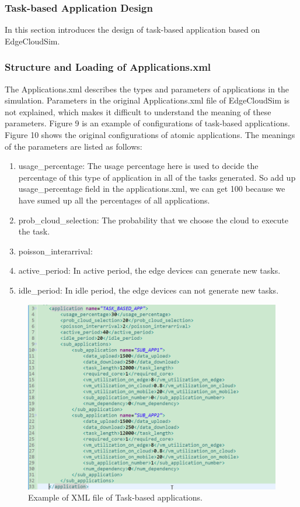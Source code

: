 \subsubsection{Task-based Application Design}
In this section introduces the design of task-based application based on EdgeCloudSim.

\subsubsection{Structure and Loading of Applications.xml}
The Applications.xml describes the types and parameters of applications in the simulation. Parameters in the original Applications.xml file of EdgeCloudSim is not explained, which makes it difficult to understand the meaning of these parameters. Figure 9 is an example of configurations of task-based applications. Figure 10 shows the original configurations of atomic applications.
The meanings of the parameters are listed as follows:

\begin{enumerate}
	\item usage\_percentage: The usage percentage here is used to decide the percentage of this type of application in all of the tasks generated. So add up usage\_percentage field in the applications.xml, we can get 100 because we have sumed up all the percentages of all applications.
	\item prob\_cloud\_selection: The probability that we choose the cloud to execute the task.
	\item poisson\_interarrival:
	\item active\_period: In active period, the edge devices can generate new tasks.
	\item idle\_period: In idle period, the edge devices can not generate new tasks.
\end{enumerate}

\begin{figure}
	\centering
	\includegraphics[width=1\textwidth]{./figures/task-based-xml.png}
	\caption{\label{fig:frog}Example of XML file of Task-based applications.}
\end{figure}

